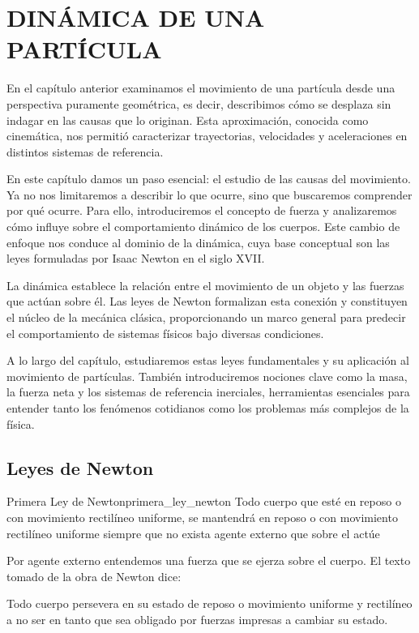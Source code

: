 \chapter[Dinámica de una partícula]{DINÁMICA DE UNA PARTÍCULA}\label{chap:cap2}
\startcontents
\printchaptertableofcontents

En el capítulo anterior examinamos el movimiento de una partícula desde una perspectiva puramente geométrica, es decir, describimos cómo se desplaza sin indagar en las causas que lo originan. Esta aproximación, conocida como cinemática, nos permitió caracterizar trayectorias, velocidades y aceleraciones en distintos sistemas de referencia.

En este capítulo damos un paso esencial: el estudio de las causas del movimiento. Ya no nos limitaremos a describir lo que ocurre, sino que buscaremos comprender por qué ocurre. Para ello, introduciremos el concepto de fuerza y analizaremos cómo influye sobre el comportamiento dinámico de los cuerpos. Este cambio de enfoque nos conduce al dominio de la dinámica, cuya base conceptual son las leyes formuladas por Isaac Newton en el siglo XVII.

La dinámica establece la relación entre el movimiento de un objeto y las fuerzas que actúan sobre él. Las leyes de Newton formalizan esta conexión y constituyen el núcleo de la mecánica clásica, proporcionando un marco general para predecir el comportamiento de sistemas físicos bajo diversas condiciones.

A lo largo del capítulo, estudiaremos estas leyes fundamentales y su aplicación al movimiento de partículas. También introduciremos nociones clave como la masa, la fuerza neta y los sistemas de referencia inerciales, herramientas esenciales para entender tanto los fenómenos cotidianos como los problemas más complejos de la física.

\section{Leyes de Newton}

\begin{definition}{Primera Ley de Newton}{primera_ley_newton}
    Todo cuerpo que esté en reposo o con movimiento rectilíneo uniforme, se mantendrá en reposo o con movimiento rectilíneo uniforme siempre que no exista agente externo que sobre el actúe
\end{definition}

Por agente externo entendemos una fuerza que se ejerza sobre el cuerpo. El texto tomado de la obra de Newton dice:
\begin{primera}
    Todo cuerpo persevera en su estado de reposo o movimiento uniforme y rectilíneo a no ser en tanto que sea obligado por fuerzas impresas a cambiar su estado.
\end{primera}

